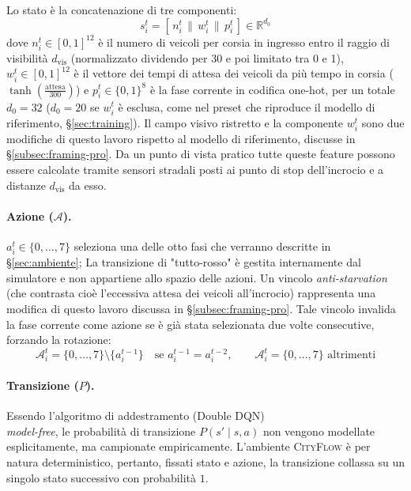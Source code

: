 Lo stato è la concatenazione di tre componenti:
\begin{equation}
  s_i^t = [\,n_i^t \,\|\, w_i^t \,\|\, p_i^t\,] \in \mathbb{R}^{d_0}
\end{equation}
dove $n_i^t \in [0,1]^{12}$ è il numero di veicoli per corsia in ingresso entro il raggio di visibilità $d_{\text{vis}}$ (normalizzato dividendo per 30 e poi limitato tra 0 e 1),
$w_i^t \in [0,1]^{12}$ è il vettore dei tempi di attesa dei veicoli da più tempo in corsia ($\tanh(\frac{\text{attesa}}{300})$) e
$p_i^t \in \{0,1\}^8$ è la fase corrente in codifica one-hot, per un totale $d_0 = 32$ ($d_0=20$ se $w_i^t$ è esclusa, come nel preset che riproduce il modello di riferimento, §\ref{sec:training}).
Il campo visivo ristretto e la componente $w_i^t$ sono due modifiche di questo lavoro rispetto al modello di riferimento, discusse in §\ref{subsec:framing-pro}.
Da un punto di vista pratico tutte queste feature possono essere calcolate tramite sensori stradali
posti ai punto di stop dell'incrocio e a distanze $d_{\text{vis}}$ da esso.

\paragraph{Azione ($\mathcal{A}$).} $a_i^t \in \{0, \dots, 7\}$ seleziona una delle otto fasi che verranno descritte in §\ref{sec:ambiente};
La transizione di "tutto-rosso" è gestita internamente dal simulatore e non appartiene allo spazio delle azioni.
Un vincolo \emph{anti-starvation} (che contrasta cioè l'eccessiva attesa dei veicoli all'incrocio) rappresenta una modifica di questo lavoro discussa in
§\ref{subsec:framing-pro}. Tale vincolo invalida
la fase corrente come azione se è già stata selezionata due volte
consecutive, forzando la rotazione:
\begin{equation}
  \mathcal{A}_i^t = \{0,\dots,7\} \setminus \{a_i^{t-1}\} \quad \text{se } a_i^{t-1} = a_i^{t-2}, \qquad \mathcal{A}_i^t = \{0,\dots,7\} \text{ altrimenti}
  \label{eq:action-mask}
\end{equation}

\paragraph{Transizione ($P$).} Essendo l'algoritmo di addestramento (Double DQN) \\
\emph{model-free}, le probabilità di transizione $P(s'\mid s,a)$ non vengono modellate esplicitamente, ma campionate empiricamente.
L'ambiente \textsc{CityFlow} è per natura deterministico, pertanto, fissati stato e azione, la transizione
collassa su un singolo stato successivo con probabilità $1$.

